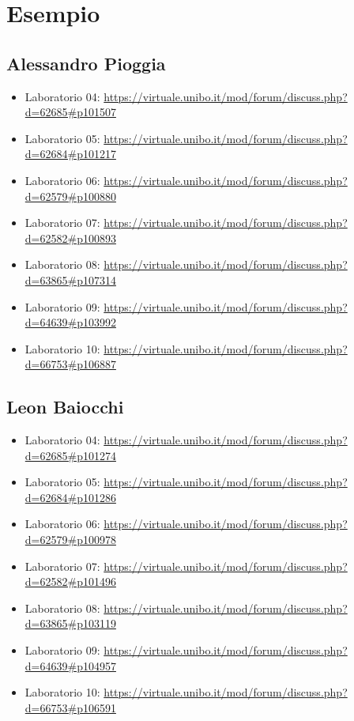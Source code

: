 \section*{Esempio}

\subsection{Alessandro Pioggia}

\begin{itemize}
	\item Laboratorio 04: \url{https://virtuale.unibo.it/mod/forum/discuss.php?d=62685#p101507}
	\item Laboratorio 05: \url{https://virtuale.unibo.it/mod/forum/discuss.php?d=62684#p101217}
	\item Laboratorio 06: \url{https://virtuale.unibo.it/mod/forum/discuss.php?d=62579#p100880}
	\item Laboratorio 07: \url{https://virtuale.unibo.it/mod/forum/discuss.php?d=62582#p100893}
	\item Laboratorio 08: \url{https://virtuale.unibo.it/mod/forum/discuss.php?d=63865#p107314}
	\item Laboratorio 09: \url{https://virtuale.unibo.it/mod/forum/discuss.php?d=64639#p103992}
	\item Laboratorio 10: \url{https://virtuale.unibo.it/mod/forum/discuss.php?d=66753#p106887}
\end{itemize}

\subsection{Leon Baiocchi}

\begin{itemize}
	\item Laboratorio 04: \url{https://virtuale.unibo.it/mod/forum/discuss.php?d=62685#p101274}
	\item Laboratorio 05: \url{https://virtuale.unibo.it/mod/forum/discuss.php?d=62684#p101286}
	\item Laboratorio 06: \url{https://virtuale.unibo.it/mod/forum/discuss.php?d=62579#p100978}
	\item Laboratorio 07: \url{https://virtuale.unibo.it/mod/forum/discuss.php?d=62582#p101496}
	\item Laboratorio 08: \url{https://virtuale.unibo.it/mod/forum/discuss.php?d=63865#p103119}
	\item Laboratorio 09: \url{https://virtuale.unibo.it/mod/forum/discuss.php?d=64639#p104957}
	\item Laboratorio 10: \url{https://virtuale.unibo.it/mod/forum/discuss.php?d=66753#p106591}
\end{itemize}



